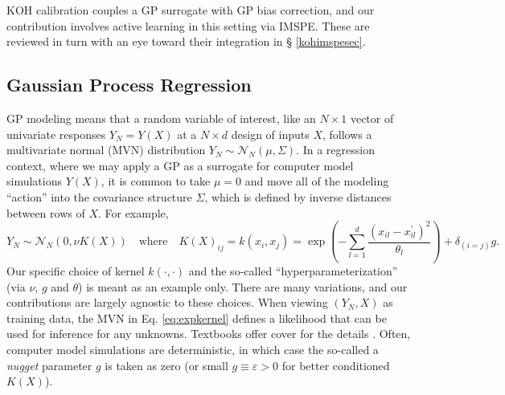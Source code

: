 \documentclass[
]{article}
\begin{document}
KOH calibration couples a GP surrogate with GP bias correction, and our
contribution involves active learning in this setting via IMSPE. These are
reviewed in turn with an eye toward their integration in \S
\ref{kohimspesec}.

\hypertarget{gpsec}{%
\subsection{Gaussian Process Regression}\label{gpsec}}

GP modeling means that a random variable of interest, like
an \(N \times 1\) vector of univariate responses \(Y_N = Y(X)\) at a
\(N\times d\) design of inputs \(X\), follows a multivariate normal (MVN)
distribution \(Y_N \sim \mathcal{N}_N (\mu, \Sigma)\). In a regression
context, where we may apply a GP as a surrogate for computer model
simulations \(Y(X)\), it is common to take \(\mu = 0\) and move all of the
modeling ``action'' into the covariance structure \(\Sigma\), which is
defined by inverse distances between rows of \(X\). For example,\begin{equation}
Y_N \sim \mathcal{N}_N\left(0, \nu K(X)\right) \quad \mbox{where} \quad 
K(X)_{ij} = k(x_i, x_j) = \exp\left(-\sum_{l=1}^d\frac{(x_{il} - x_{il}^\prime)^2}{\theta_l}\right) + \delta_{(i=j)} g.
\label{eq:expkernel}
\end{equation} Our specific choice of kernel \(k(\cdot, \cdot)\) and the
so-called ``hyperparameterization'' (via \(\nu\), \(g\) and \(\theta\)) is meant
as an example only. There are many variations, and our contributions are
largely agnostic to these choices. When viewing \((Y_N, X)\) as training
data, the MVN in Eq. \eqref{eq:expkernel} defines a likelihood that can
be used for inference for any unknowns. Textbooks offer cover for the details \citep{williams2006gaussian, santner2018design, gramacy2020surrogates}. Often, computer model simulations are
deterministic, in which case the so-called a \emph{nugget} parameter \(g\) is
taken as zero (or small \(g \equiv \varepsilon > 0\) for better conditioned
\(K(X)\)).
\end{document}
